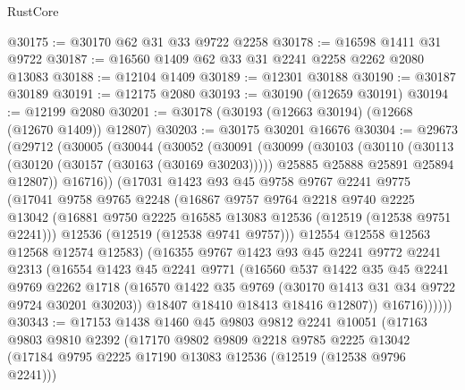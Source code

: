 \begin{lexlean}{RustCore}
\begin{coremodule}
@30175 := @30170 @62 @31 @33 @9722 @2258
@30178 := @16598 @1411 @31 @9722
@30187 := @16560 @1409 @62 @33 @31 @2241 @2258 @2262 @2080 @13083
@30188 := @12104 @1409
@30189 := @12301 @30188
@30190 := @30187 @30189
@30191 := @12175 @2080
@30193 := @30190 (@12659 @30191)
@30194 := @12199 @2080
@30201 := @30178 (@30193 (@12663 @30194) (@12668 (@12670 @1409)) @12807)
@30203 := @30175 @30201 @16676
@30304 := @29673
    (@29712
      (@30005
        (@30044
          (@30052
            (@30091
              (@30099
                (@30103
                  (@30110
                    (@30113 (@30120 (@30157 (@30163 (@30169 @30203)))))
                    @25885
                    @25888
                    @25891
                    @25894
                    @12807))
                @16716))
            (@17031
              @1423
              @93
              @45
              @9758
              @9767
              @2241
              @9775
              (@17041
                @9758
                @9765
                @2248
                (@16867
                  @9757
                  @9764
                  @2218
                  @9740
                  @2225
                  @13042
                  (@16881 @9750 @2225 @16585 @13083 @12536 (@12519 (@12538 @9751 @2241)))
                  @12536
                  (@12519 (@12538 @9741 @9757)))
                @12554
                @12558
                @12563
                @12568
                @12574
                @12583)
              (@16355
                @9767
                @1423
                @93
                @45
                @2241
                @9772
                @2241
                @2313
                (@16554
                  @1423
                  @45
                  @2241
                  @9771
                  (@16560
                    @537
                    @1422
                    @35
                    @45
                    @2241
                    @9769
                    @2262
                    @1718
                    (@16570 @1422 @35 @9769 (@30170 @1413 @31 @34 @9722 @9724 @30201 @30203))
                    @18407
                    @18410
                    @18413
                    @18416
                    @12807))
                @16716))))))
@30343 := @17153
    @1438
    @1460
    @45
    @9803
    @9812
    @2241
    @10051
    (@17163
      @9803
      @9810
      @2392
      (@17170
        @9802
        @9809
        @2218
        @9785
        @2225
        @13042
        (@17184 @9795 @2225 @17190 @13083 @12536 (@12519 (@12538 @9796 @2241)))

\end{coremodule}
\end{lexlean}
